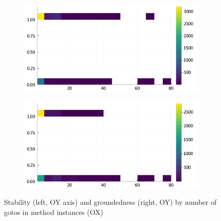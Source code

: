\begin{figure}[h]
     \begin{subfigure}[b]{0.49\textwidth}
       \includegraphics[width=\textwidth]{figs/all-package-graphs/Plots-gotos-vs-stable.pdf}
     \end{subfigure}
     \begin{subfigure}[b]{0.49\textwidth}
       \includegraphics[width=\textwidth]{figs/all-package-graphs/Plots-gotos-vs-grounded.pdf}
     \end{subfigure}
\caption{Stability (left, OY axis) and groundedness (right, OY) by number of gotos in method instances (OX)}%
%
\label{figs:gotos:Plots}
\end{figure}

